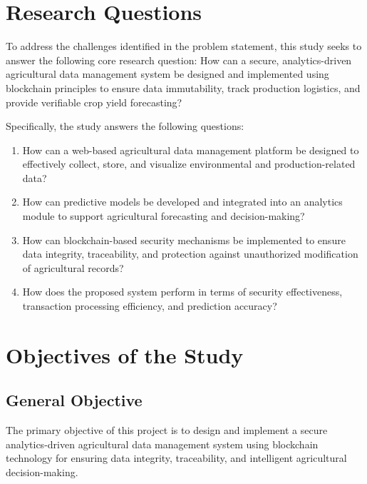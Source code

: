\section{Research Questions}

To address the challenges identified in the problem statement, this study seeks to answer the following core research question: How can a secure, analytics-driven agricultural data management system be designed and implemented using blockchain principles to ensure data immutability, track production logistics, and provide verifiable crop yield forecasting?

Specifically, the study answers the following questions:
\begin{enumerate}
    \item How can a web-based agricultural data management platform be designed to effectively collect, store, and visualize environmental and production-related data?
    \item How can predictive models be developed and integrated into an analytics module to support agricultural forecasting and decision-making?
    \item How can blockchain-based security mechanisms be implemented to ensure data integrity, traceability, and protection against unauthorized modification of agricultural records?
    \item How does the proposed system perform in terms of security effectiveness, transaction processing efficiency, and prediction accuracy?
\end{enumerate}

\section{Objectives of the Study}

\subsection{General Objective}
The primary objective of this project is to design and implement a secure analytics-driven agricultural data management system using blockchain technology for ensuring data integrity, traceability, and intelligent agricultural decision-making.

